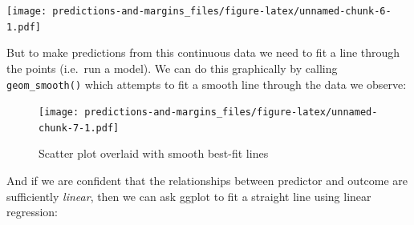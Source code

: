 \documentclass[]{article}
\newenvironment{Shaded}{\begin{snugshade}}{\end{snugshade}}
\newcommand{\KeywordTok}[1]{\textcolor[rgb]{0.13,0.29,0.53}{\textbf{#1}}}
\newcommand{\DataTypeTok}[1]{\textcolor[rgb]{0.13,0.29,0.53}{#1}}
\newcommand{\DecValTok}[1]{\textcolor[rgb]{0.00,0.00,0.81}{#1}}
\newcommand{\StringTok}[1]{\textcolor[rgb]{0.31,0.60,0.02}{#1}}
\newcommand{\OperatorTok}[1]{\textcolor[rgb]{0.81,0.36,0.00}{\textbf{#1}}}
\newcommand{\NormalTok}[1]{#1}
\theoremstyle{definition}
\theoremstyle{definition}
\theoremstyle{definition}
\theoremstyle{remark}
\begin{document}
\begin{Shaded}
\end{Shaded}

\texttt{[image: predictions-and-margins\_files/figure-latex/unnamed-chunk-6-1.pdf]}

But to make predictions from this continuous data we need to fit a line
through the points (i.e.~run a model). We can do this graphically by
calling \texttt{geom\_smooth()} which attempts to fit a smooth line
through the data we observe:

\begin{Shaded}
\end{Shaded}

\begin{figure}
\centering
\texttt{[image: predictions-and-margins\_files/figure-latex/unnamed-chunk-7-1.pdf]}
\caption{\label{fig:unnamed-chunk-7}Scatter plot overlaid with smooth
best-fit lines}
\end{figure}

And if we are confident that the relationships between predictor and
outcome are sufficiently \emph{linear}, then we can ask ggplot to fit a
straight line using linear regression:
\end{document}
